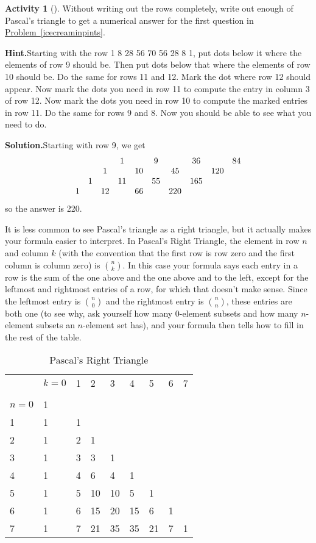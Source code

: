 \documentclass[10pt,]{book}
\theoremstyle{plain}
\theoremstyle{definition}
\newtheorem{activity}[project]{Activity}
\numberwithin{equation}{chapter}
\newcommand{\hrulethin}  {\noalign{\hrule height 0.04em}}
\newcommand{\amp}{&}
\begin{document}
\begin{activity}[]\label{activity-31}
Without writing out the rows completely, write out enough of Pascal's triangle to get a numerical answer for the first question in \hyperref[icecreaminpints]{Problem~\ref{icecreaminpints}}.%
\par\medskip\noindent%
\textbf{Hint.}\quad Starting with the row 1 8 28 56 70 56 28 8 1, put dots below it where the elements of row 9 should be. Then put dots below that where the elements of row 10 should be. Do the same for rows 11 and 12. Mark the dot where row 12 should appear. Now mark the dots you need in row 11 to compute the entry in column 3 of row 12. Now mark the dots you need in row 10 to compute the marked entries in row 11. Do the same for rows 9 and 8. Now you should be able to see what you need to do.\par\medskip\noindent%
\textbf{Solution.}\quad Starting with row 9, we get%
\begin{equation*}
\begin{matrix}\amp \amp \amp 1\amp \amp 9\amp \amp 36\amp \amp 84 \cr\amp \amp 1\amp \amp 10\amp \amp 45\amp \amp 120\cr\amp 1\amp \amp 11\amp \amp 55\amp \amp 165\cr
1\amp \amp 12\amp \amp 66\amp \amp 220
\end{matrix}
\end{equation*}
so the answer is 220.%
\end{activity}
It is less common to see Pascal's triangle as a right triangle, but it actually makes your formula easier to interpret. In Pascal's Right Triangle, the element in row \(n\) and column \(k\) (with the convention that the first row is row zero and the first column is column zero) is \(n\choose k\). In this case your formula says each entry in a row is the sum of the one above and the one above and to the left, except for the leftmost and rightmost entries of a row, for which that doesn't make sense. Since the leftmost entry is \(n\choose 0\) and the rightmost entry is \(n\choose n\), these entries are both one (to see why, ask yourself how many \(0\)-element subsets and how many \(n\)-element subsets an \(n\)-element set has), and your formula then tells how to fill in the rest of the table.%
\begin{table}
\centering
\begin{tabular}{lllllllll}
&\(k=0\)&1&2&3&4&5&6&7\tabularnewline[0pt]
&&&&&&&&\tabularnewline\hrulethin
\(n=0\)&1&&&&&&\tabularnewline[0pt]
1&1&1&&&&&\tabularnewline[0pt]
2&1&2&1&&&&&\tabularnewline[0pt]
3&1&3&3&1&&&&\tabularnewline[0pt]
4&1&4&6&4&1&&&\tabularnewline[0pt]
5&1&5&10&10&5&1&&\tabularnewline[0pt]
6&1&6&15&20&15&6&1&\tabularnewline[0pt]
7&1&7&21&35&35&21&7&1
\end{tabular}
\caption{Pascal's Right Triangle\label{Pascalrighttriangle}}
\end{table}
\end{document}
